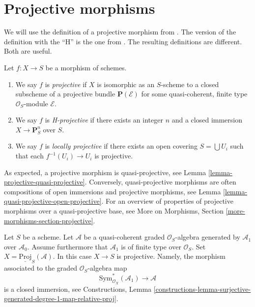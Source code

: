 \section{Projective morphisms}
\label{section-projective}

\noindent
We will use the definition of a projective morphism from \cite{EGA}.
The version of the definition with the ``H'' is the one
from \cite{H}. The resulting definitions are different. Both are useful.

\begin{definition}
\label{definition-projective}
Let $f : X \to S$ be a morphism of schemes.
\begin{enumerate}
\item We say $f$ is {\it projective} if $X$ is isomorphic as
an $S$-scheme to a closed subscheme of a projective
bundle $\mathbf{P}(\mathcal{E})$
for some quasi-coherent, finite type $\mathcal{O}_S$-module $\mathcal{E}$.
\item We say $f$ is {\it H-projective} if there exists an integer $n$ and
a closed immersion $X \to \mathbf{P}^n_S$ over $S$.
\item We say $f$ is {\it locally projective} if there exists an open
covering $S = \bigcup U_i$ such that each $f^{-1}(U_i) \to U_i$ is
projective.
\end{enumerate}
\end{definition}

\noindent
As expected, a projective morphism is quasi-projective, see
Lemma \ref{lemma-projective-quasi-projective}.
Conversely, quasi-projective morphisms are often compositions
of open immersions and projective morphisms, see
Lemma \ref{lemma-quasi-projective-open-projective}.
For an overview of properties of projective morphisms over
a quasi-projective base, see
More on Morphisms, Section \ref{more-morphisms-section-projective}.

\begin{example}
\label{example-projective}
Let $S$ be a scheme. Let $\mathcal{A}$ be a quasi-coherent graded
$\mathcal{O}_S$-algebra generated by $\mathcal{A}_1$ over $\mathcal{A}_0$.
Assume furthermore that $\mathcal{A}_1$ is of finite type over
$\mathcal{O}_S$. Set $X = \underline{\text{Proj}}_S(\mathcal{A})$.
In this case $X \to S$ is projective. Namely,
the morphism associated to the graded $\mathcal{O}_S$-algebra map
$$
\text{Sym}_{\mathcal{O}_X}^*(\mathcal{A}_1)
\longrightarrow
\mathcal{A}
$$
is a closed immersion, see
Constructions, Lemma
\ref{constructions-lemma-surjective-generated-degree-1-map-relative-proj}.
\end{example}
 
